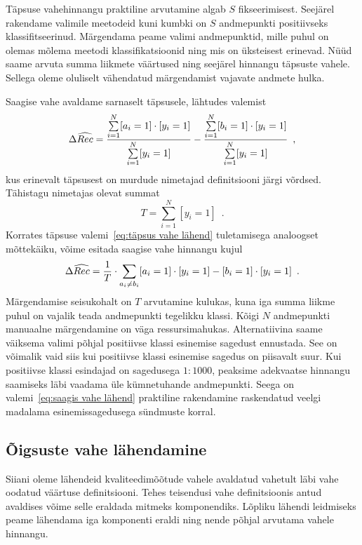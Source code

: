 Täpsuse vahehinnangu praktiline arvutamine algab $S$ fikseerimisest. Seejärel rakendame valimile meetodeid kuni kumbki on $S$ andmepunkti positiivseks klassifitseerinud. Märgendama peame valimi andmepunktid, mille puhul on olemas mõlema meetodi klassifikatsioonid ning mis on üksteisest erinevad. Nüüd saame arvuta summa liikmete väärtused ning seejärel hinnangu täpsuste vahele. Sellega oleme oluliselt vähendatud märgendamist vajavate andmete hulka.

Saagise vahe avaldame sarnaselt täpsusele, lähtudes valemist
\begin{equation*}
    \Delta \widehat{Rec} = \frac{\sum \limits_{i = 1}^{N} [a_i = 1] \cdot [y_i = 1]}{\sum \limits_{i = 1}^{N} [y_i = 1]} - \frac{\sum \limits_{i = 1}^{N} [b_i = 1] \cdot [y_i = 1]}{\sum \limits_{i = 1}^{N} [y_i = 1]} \enspace,
\end{equation*}
kus erinevalt täpsusest on murdude nimetajad definitsiooni järgi võrdsed. Tähistagu nimetajas olevat summat
\begin{equation*}
    T = \sum_{i = 1}^N [y_i = 1] \enspace.
\end{equation*}
Korrates täpsuse valemi~\eqref{eq:täpsus vahe lähend} tuletamisega analoogset mõttekäiku, võime esitada saagise vahe hinnangu kujul
\begin{equation}
    \label{eq:saagis vahe lähend}
    \Delta \widehat{Rec} = \frac{1}{T} \cdot \sum_{a_i \neq b_i} [a_i = 1] \cdot [y_i = 1] - [b_i = 1] \cdot [y_i = 1] \enspace. 
\end{equation}
Märgendamise seisukohalt on $T$ arvutamine kulukas, kuna iga summa liikme puhul on vajalik teada andmepunkti tegelikku klassi. Kõigi $N$ andmepunkti manuaalne märgendamine on väga ressursimahukas. Alternatiivina saame väiksema valimi põhjal positiivse klassi esinemise sagedust ennustada. See on võimalik vaid siis kui positiivse klassi esinemise sagedus on piisavalt suur. Kui positiivse klassi esindajad on sagedusega $1:1000$, peaksime adekvaatse hinnangu saamiseks läbi vaadama üle kümnetuhande andmepunkti. Seega on valemi~\eqref{eq:saagis vahe lähend} praktiline rakendamine raskendatud veelgi madalama esinemissagedusega sündmuste korral.

\subsection{Õigsuste vahe lähendamine}
Siiani oleme lähendeid kvaliteedimõõtude vahele avaldatud vahetult läbi vahe oodatud väärtuse definitsiooni. Tehes teisendusi vahe definitsioonis antud avaldises võime selle eraldada mitmeks komponendiks. Lõpliku lähendi leidmiseks peame lähendama iga komponenti eraldi ning nende põhjal arvutama vahele hinnangu.

